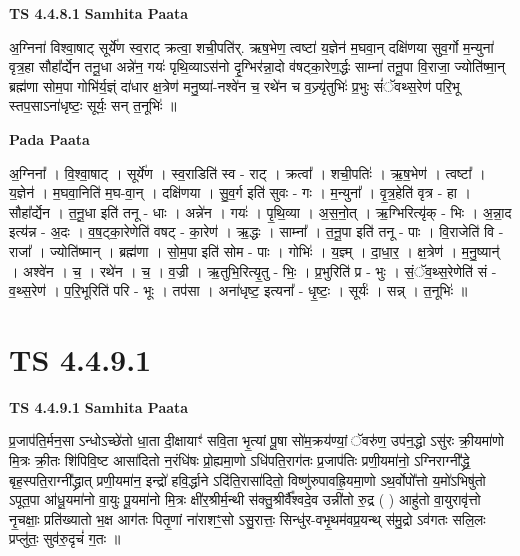\documentclass[17pt]{extarticle}
\begin{document}
\textbf{TS 4.4.8.1 } \newline
\textbf{Samhita Paata} \newline

अ॒ग्निना॑ विश्वा॒षाट् सूर्ये॑ण स्व॒राट् क्रत्वा॒ शची॒पति॑र्. ऋष॒भेण॒ त्वष्टा॑ य॒ज्ञेन॑ म॒घवा॒न् दक्षि॑णया सुव॒र्गो म॒न्युना॑ वृत्र॒हा सौहा᳚र्द्येन तनू॒धा अन्ने॑न॒ गयः॑ पृथि॒व्याऽस॑नो दृ॒ग्भिर॑न्ना॒दो व॑षट्का॒रेण॒र्द्धः साम्ना॑ तनू॒पा वि॒राजा॒ ज्योति॑ष्मा॒न् ब्रह्म॑णा सोम॒पा गोभि॑र्य॒ज्ञ्ं दा॑धार क्ष॒त्रेण॑ मनु॒ष्या॑-नश्वे॑न च॒ रथे॑न च व॒ज्र्यृ॑तुभिः॑ प्र॒भुः सं॑ॅवथ्स॒रेण॑ परि॒भू स्तप॒साऽना॑धृष्टः॒ सूर्यः॒ सन् त॒नूभिः॑ ॥ \newline

\textbf{Pada Paata} \newline

अ॒ग्निना᳚ । वि॒श्वा॒षाट् । सूर्ये॑ण । स्व॒राडिति॑ स्व - राट् । क्रत्वा᳚ । शची॒पतिः॑ । ऋ॒ष॒भेण॑ । त्वष्टा᳚ । य॒ज्ञेन॑ । म॒घवा॒निति॑ म॒घ-वा॒न् । दक्षि॑णया । सु॒व॒र्ग इति॑ सुवः - गः । म॒न्युना᳚ । वृ॒त्र॒हेति॑ वृत्र - हा । सौहा᳚र्द्येन । त॒नू॒धा इति॑ तनू - धाः । अन्ने॑न । गयः॑ । पृ॒थि॒व्या । अ॒स॒नो॒त् । ऋ॒ग्भिरित्यृ॑क् - भिः । अ॒न्ना॒द इत्य॑न्न - अ॒दः । व॒ष॒ट्का॒रेणेति॑ वषट् - का॒रेण॑ । ऋ॒द्धः । साम्ना᳚ । त॒नू॒पा इति॑ तनू - पाः । वि॒राजेति॑ वि - राजा᳚ । ज्योति॑ष्मान् । ब्रह्म॑णा । सो॒म॒पा इति॑ सोम - पाः । गोभिः॑ । य॒ज्ञ्म् । दा॒धा॒र॒ । क्ष॒त्रेण॑ । म॒नु॒ष्यान्॑ । अश्वे॑न । च॒ । रथे॑न । च॒ । व॒ज्री । ऋ॒तुभि॒रित्यृ॒तु - भिः॒ । प्र॒भुरिति॑ प्र - भुः । सं॒ॅव॒थ्स॒रेणेति॑ सं - व॒थ्स॒रेण॑ । प॒रि॒भूरिति॑ परि - भूः । तप॑सा । अना॑धृष्ट॒ इत्यना᳚ - धृ॒ष्टः॒ । सूर्यः॑ । सन्न् । त॒नूभिः॑ ॥  \newline




\section*{ TS 4.4.9.1 }

\textbf{TS 4.4.9.1 } \newline
\textbf{Samhita Paata} \newline

प्र॒जाप॑ति॒र्मन॒सा ऽन्धोऽच्छे॑तो धा॒ता दी॒क्षायाꣳ॑ सवि॒ता भृ॒त्यां पू॒षा सो॑म॒क्रय॑ण्यां॒ ॅवरु॑ण॒ उप॑न॒द्धो ऽसु॑रः क्री॒यमा॑णो मि॒त्रः क्री॒तः शि॑पिवि॒ष्ट आसा॑दितो न॒रंधि॑षः प्रो॒ह्यमा॒णो ऽधि॑पति॒राग॑तः प्र॒जाप॑तिः प्रणी॒यमा॑नो॒ ऽग्निराग्नी᳚द्ध्रे॒ बृह॒स्पति॒राग्नी᳚द्ध्रात् प्रणी॒यमा॑न॒ इन्द्रो॑ हवि॒र्द्धाने ऽदि॑ति॒रासा॑दितो॒ विष्णु॑रुपावह्रि॒यमा॒णो ऽथ॒र्वोपो᳚त्तो य॒मो॑ऽभिषु॑तो ऽपूत॒पा आ॑धू॒यमा॑नो वा॒युः पू॒यमा॑नो मि॒त्रः क्षी॑र॒श्रीर्म॒न्थी स॑क्तु॒श्रीर्वै᳚श्वदे॒व उन्नी॑तो रु॒द्र ( ) आहु॑तो वा॒युरावृ॑त्तो नृ॒चक्षाः॒ प्रति॑ख्यातो भ॒क्ष आग॑तः पितृ॒णां ना॑राशꣳ॒॒सो ऽसु॒रात्तः॒ सिन्धु॑र-वभृ॒थम॑वप्र॒यन्थ् स॑मु॒द्रो ऽव॑गतः सलि॒लः प्रप्लु॑तः॒ सुव॑रु॒दृचं॑ ग॒तः ॥ \newline
\end{document}
